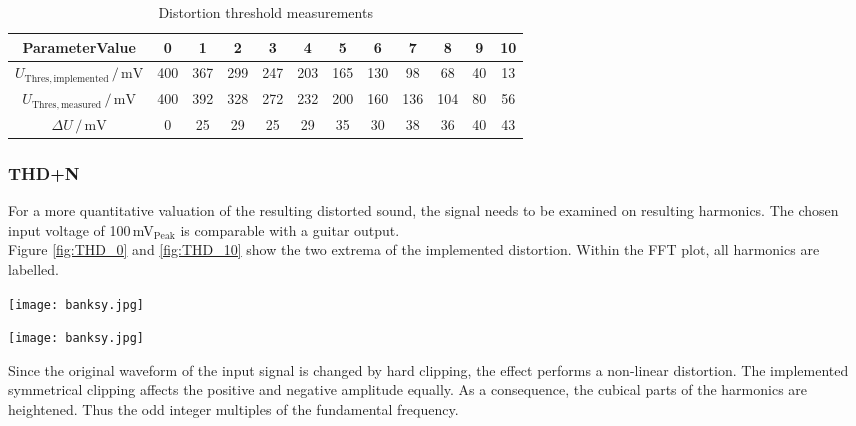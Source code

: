 \begin{table}[H]
\begin{center}
\begin{tabular}{|c||c|c|c|c|c|c|c|c|c|c|c|}
\hline 
\textbf{ParameterValue} & 0 & 1 & 2 & 3 & 4 & 5 & 6 & 7 & 8 & 9 & 10 \\ 
\hline 
$U_{\mathrm{Thres,implemented}}\,/\,\mathrm{mV}$ & 400 & 367 & 299 & 247 & 203 & 165 & 130 & 98 & 68 & 40 & 13 \\ 
\hline 
$U_{\mathrm{Thres,measured}}\,/\,\mathrm{mV}$ & 400 & 392 & 328 & 272 & 232 & 200 & 160 & 136 & 104 & 80 & 56 \\ 
\hline 
$\Delta U\,/\,\mathrm{mV}$ & 0 & 25 & 29 & 25 & 29 & 35 & 30 & 38 & 36 & 40 & 43 \\ 
\hline 
\end{tabular} 
\end{center}
\caption{Distortion threshold measurements}
\label{tab:ThresMeasurements}
\end{table}



\subsubsection{THD+N}
For a more quantitative valuation of the resulting distorted sound, the signal needs to be examined on resulting harmonics. The chosen input voltage of 100\,mV$_{\mathrm{Peak}}$ is comparable with a guitar output.\\
Figure \ref{fig:THD_0} and \ref{fig:THD_10} show the two extrema of the implemented distortion.
Within the FFT plot, all harmonics are labelled.\\

\begin{minipage}[t]{0.5\textwidth}
\texttt{[image: banksy.jpg]}
\label{fig:THD_0}
\end{minipage}
\begin{minipage}[t]{0.5\textwidth}
\texttt{[image: banksy.jpg]}
\label{fig:THD_10}
\end{minipage}

Since the original waveform of the input signal is changed by hard clipping, the effect performs a non-linear distortion.
The implemented symmetrical clipping affects the positive and negative amplitude equally. 
As a consequence, the cubical parts of the harmonics are heightened. Thus the odd integer multiples of the fundamental frequency.
\\

